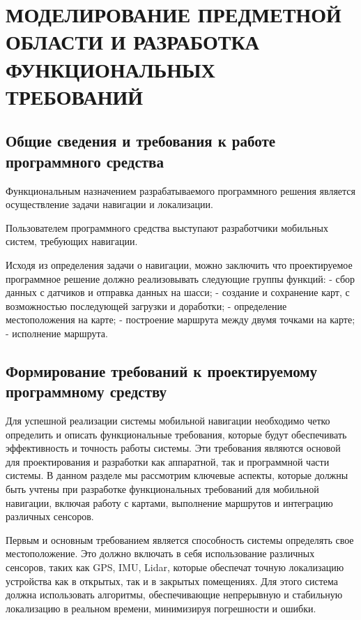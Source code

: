 \section{МОДЕЛИРОВАНИЕ ПРЕДМЕТНОЙ ОБЛАСТИ И РАЗРАБОТКА ФУНКЦИОНАЛЬНЫХ
ТРЕБОВАНИЙ}

\subsection{Общие сведения и требования к работе программного средства}

\sloppy
Функциональным назначением разрабатываемого программного решения является
осуществление задачи навигации и локализации.

Пользователем программного средства выступают разработчики мобильных систем,
требующих навигации.

Исходя из определения задачи о навигации, можно заключить что проектируемое
программное решение должно реализовывать следующие группы функций:
- сбор данных с датчиков и отправка данных на шасси;
- создание и сохранение карт, с возможностью последующей загрузки и доработки;
- определение местоположения на карте;
- построение маршрута между двумя точками на карте;
- исполнение маршрута.

\subsection{Формирование требований к проектируемому программному средству}

Для успешной реализации системы мобильной навигации необходимо четко определить
и описать функциональные требования, которые будут обеспечивать эффективность и
точность работы системы. Эти требования являются основой для проектирования и
разработки как аппаратной, так и программной части системы. В данном разделе мы
рассмотрим ключевые аспекты, которые должны быть учтены при разработке
функциональных требований для мобильной навигации, включая работу с картами,
выполнение маршрутов и интеграцию различных сенсоров.

Первым и основным требованием является способность системы определять свое
местоположение. Это должно включать в себя использование различных сенсоров,
таких как GPS, IMU, Lidar, которые обеспечат точную локализацию устройства как в
открытых, так и в закрытых помещениях. Для этого система должна использовать
алгоритмы, обеспечивающие непрерывную и стабильную локализацию в реальном
времени, минимизируя погрешности и ошибки.

